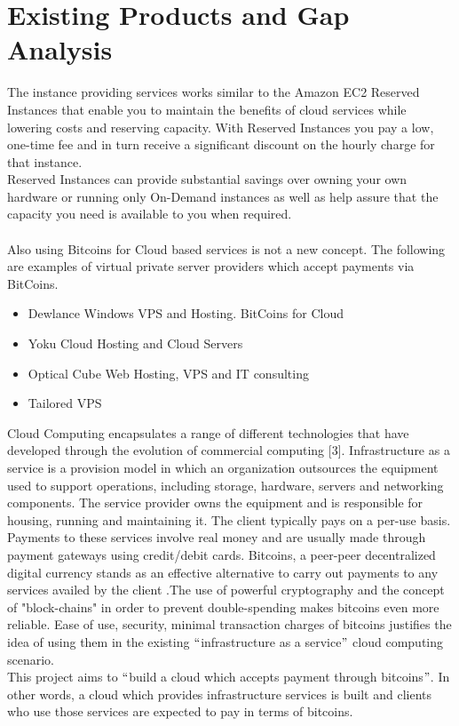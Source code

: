 \documentclass[a4page,12pt]{article}
\begin{document}
\section{Existing Products and Gap Analysis}
\vspace{0.3 in}
The instance providing services works similar to the Amazon EC2 Reserved Instances that enable you to maintain the benefits of cloud services while lowering costs and reserving capacity. With Reserved Instances you pay a low, one-time fee and in turn receive a significant discount on the hourly charge for that instance.\\ Reserved Instances can provide substantial savings over owning your own hardware or running only On-Demand instances as well as help assure that the capacity you need is available to you when required.\\\\
Also using Bitcoins for Cloud based services is not a new concept. The following are examples of virtual private server providers which accept payments via BitCoins.
\begin{itemize}
\item Dewlance Windows VPS and Hosting. BitCoins for Cloud
\item Yoku Cloud Hosting and Cloud Servers
\item Optical Cube Web Hosting, VPS and IT consulting
\item Tailored VPS
\end{itemize}
Cloud Computing encapsulates a range of different technologies that have developed through the evolution of commercial computing [3]. Infrastructure as a service is a provision model in which an organization outsources the equipment used to support operations, including storage, hardware, servers and networking components. The service provider owns the equipment and is responsible for housing, running and maintaining it. The client typically pays on a per-use basis.\\
Payments to these services involve real money and are usually made through payment gateways using credit/debit cards. Bitcoins, a peer-peer decentralized digital currency stands as an effective alternative to carry out payments to any services availed by the client .The use of powerful cryptography and the concept of "block-chains" in order to prevent double-spending makes bitcoins even more reliable. Ease of use, security, minimal transaction charges of bitcoins justifies the idea of using them in the existing $``$infrastructure as a service$"$ cloud computing scenario.\\
This project aims to $``$build a cloud which accepts payment through bitcoins$"$. In other words, a cloud which provides infrastructure services is built and clients who use those services are expected to pay in terms of bitcoins.
\end{document}
